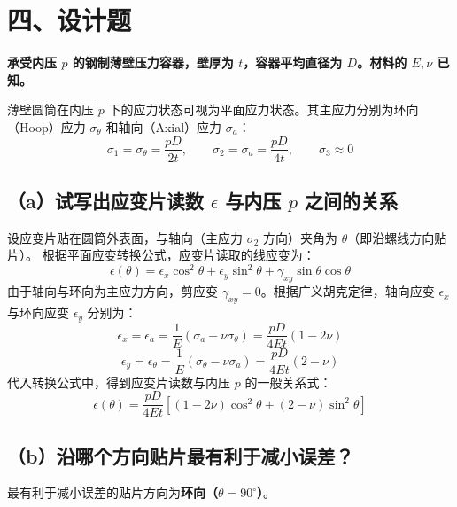 \documentclass[UTF8,fontset=windows]{ctexart}
\begin{document}
\newpage

\section*{四、设计题}

\textbf{承受内压 $p$ 的钢制薄壁压力容器，壁厚为 $t$，容器平均直径为 $D$。材料的 $E, \nu$ 已知。}

薄壁圆筒在内压 $p$ 下的应力状态可视为平面应力状态。其主应力分别为环向（Hoop）应力 $\sigma_\theta$ 和轴向（Axial）应力 $\sigma_a$：
\[
    \sigma_1 = \sigma_\theta = \frac{pD}{2t}, \qquad \sigma_2 = \sigma_a = \frac{pD}{4t}, \qquad \sigma_3 \approx 0
\]

\subsection*{（a）试写出应变片读数 $\epsilon$ 与内压 $p$ 之间的关系}

设应变片贴在圆筒外表面，与轴向（主应力 $\sigma_2$ 方向）夹角为 $\theta$（即沿螺线方向贴片）。
根据平面应变转换公式，应变片读取的线应变为：
\[
    \epsilon(\theta) = \epsilon_x \cos^2\theta + \epsilon_y \sin^2\theta + \gamma_{xy} \sin\theta \cos\theta
\]
由于轴向与环向为主应力方向，剪应变 $\gamma_{xy} = 0$。根据广义胡克定律，轴向应变 $\epsilon_x$ 与环向应变 $\epsilon_y$ 分别为：
\[
    \epsilon_x = \epsilon_a = \frac{1}{E} (\sigma_a - \nu \sigma_\theta) = \frac{pD}{4Et} (1 - 2\nu)
\]
\[
    \epsilon_y = \epsilon_\theta = \frac{1}{E} (\sigma_\theta - \nu \sigma_a) = \frac{pD}{4Et} (2 - \nu)
\]
代入转换公式中，得到应变片读数与内压 $p$ 的一般关系式：
\[
    \epsilon(\theta) = \frac{pD}{4Et} \left[ (1 - 2\nu) \cos^2\theta + (2 - \nu) \sin^2\theta \right]
\]

\subsection*{（b）沿哪个方向贴片最有利于减小误差？}

最有利于减小误差的贴片方向为\textbf{环向（$\theta = 90^\circ$）}。
\end{document}
